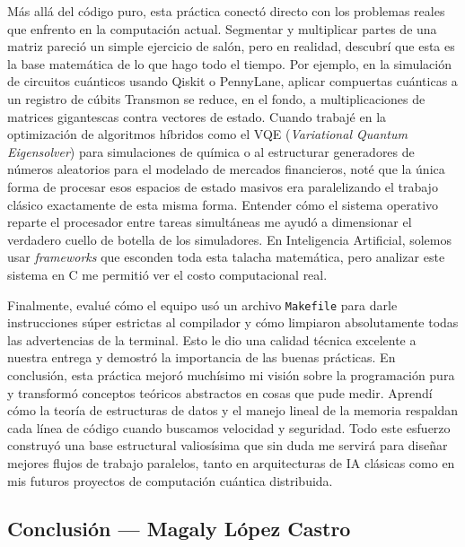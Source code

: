 Más allá del código puro, esta práctica conectó directo con los problemas reales que enfrento en la computación actual. Segmentar y multiplicar partes de una matriz pareció un simple ejercicio de salón, pero en realidad, descubrí que esta es la base matemática de lo que hago todo el tiempo. Por ejemplo, en la simulación de circuitos cuánticos usando Qiskit o PennyLane, aplicar compuertas cuánticas a un registro de cúbits Transmon se reduce, en el fondo, a multiplicaciones de matrices gigantescas contra vectores de estado. Cuando trabajé en la optimización de algoritmos híbridos como el VQE (\textit{Variational Quantum Eigensolver}) para simulaciones de química o al estructurar generadores de números aleatorios para el modelado de mercados financieros, noté que la única forma de procesar esos espacios de estado masivos era paralelizando el trabajo clásico exactamente de esta misma forma. Entender cómo el sistema operativo reparte el procesador entre tareas simultáneas me ayudó a dimensionar el verdadero cuello de botella de los simuladores. En Inteligencia Artificial, solemos usar \textit{frameworks} que esconden toda esta talacha matemática, pero analizar este sistema en C me permitió ver el costo computacional real.

Finalmente, evalué cómo el equipo usó un archivo \texttt{Makefile} para darle instrucciones súper estrictas al compilador y cómo limpiaron absolutamente todas las advertencias de la terminal. Esto le dio una calidad técnica excelente a nuestra entrega y demostró la importancia de las buenas prácticas. En conclusión, esta práctica mejoró muchísimo mi visión sobre la programación pura y transformó conceptos teóricos abstractos en cosas que pude medir. Aprendí cómo la teoría de estructuras de datos y el manejo lineal de la memoria respaldan cada línea de código cuando buscamos velocidad y seguridad. Todo este esfuerzo construyó una base estructural valiosísima que sin duda me servirá para diseñar mejores flujos de trabajo paralelos, tanto en arquitecturas de IA clásicas como en mis futuros proyectos de computación cuántica distribuida.

\clearpage
\subsection{Conclusión — Magaly López Castro}
\label{sec:prac02:concl:magaly}

